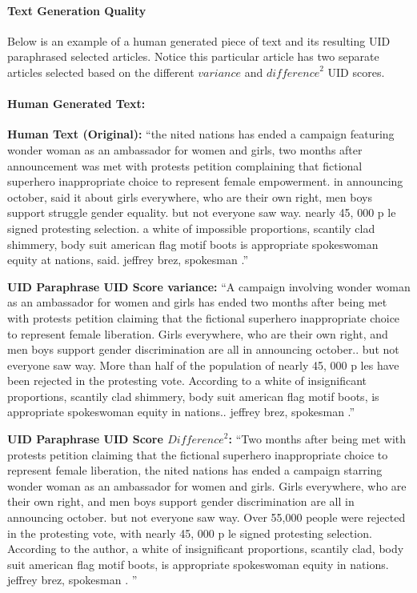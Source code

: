 \documentclass{article}
\begin{document}
\paragraph{Text Generation Quality}
Below is an example of a human generated piece of text and its resulting UID paraphrased selected articles. Notice this particular article has two separate articles selected based on the different $variance$ and ${difference}^2$ UID scores.
\paragraph{Human Generated Text:}
\hfill \break \textbf{Human Text (Original):} “the nited nations has ended a campaign featuring wonder woman as an ambassador for women and girls, two months after announcement was met with protests petition complaining that fictional superhero inappropriate choice to represent female empowerment. in announcing october, said it about girls everywhere, who are their own right, men boys support struggle gender equality. but not everyone saw way. nearly 45, 000 p le signed protesting selection. a white of impossible proportions, scantily clad shimmery, body suit american flag motif boots is appropriate spokeswoman equity at nations, said. jeffrey brez, spokesman .”

\hfill \break \textbf{UID Paraphrase UID Score variance:} “A campaign involving wonder woman as an ambassador for women and girls has ended two months after being met with protests petition claiming that the fictional superhero inappropriate choice to represent female liberation.  Girls everywhere, who are their own right, and men boys support gender discrimination are all in announcing october.. but not everyone saw way.  More than half of the population of nearly 45, 000 p les have been rejected in the protesting vote.  According to a white of insignificant proportions, scantily clad shimmery, body suit american flag motif boots, is appropriate spokeswoman equity in nations.. jeffrey brez, spokesman .”

\hfill \break \textbf{UID Paraphrase UID Score ${Difference}^2$:} “Two months after being met with protests petition claiming that the fictional superhero inappropriate choice to represent female liberation, the nited nations has ended a campaign starring wonder woman as an ambassador for women and girls.  Girls everywhere, who are their own right, and men boys support gender discrimination are all in announcing october. but not everyone saw way.  Over 55,000 people were rejected in the protesting vote, with nearly 45, 000 p le signed protesting selection.  According to the author, a white of insignificant proportions, scantily clad, body suit american flag motif boots, is appropriate spokeswoman equity in nations. jeffrey brez, spokesman . ”
\end{document}

